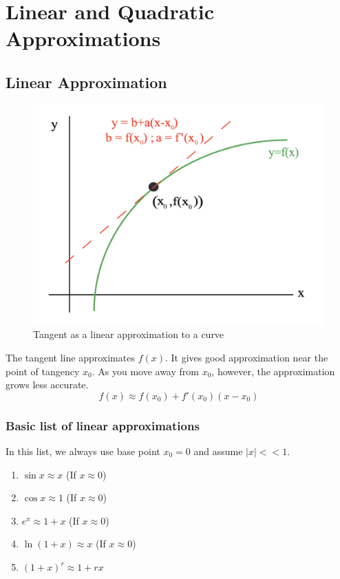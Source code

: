 

\chapter{Linear and Quadratic Approximations}

\bigbreak
\section{Linear Approximation}

\begin{figure}[ht!]
	\centering
	\includegraphics[scale=0.5]{./images/lecture_7_figure_1.png}
	\caption{Tangent as a linear approximation to a curve}
\end{figure}

The tangent line approximates $f(x)$. It gives good approximation near the point of tangency $x_0$.
As you move away from $x_0$, however, the approximation grows less accurate.
$$\boxed{ f(x) \approx f(x_0) + f'(x_0)(x-x_0) } $$

\subsection{Basic list of linear approximations}

In this list, we always use base point $x_0 = 0$ and assume $|x|<<1$.
\begin{enumerate}
	\item $\sin x	\approx x$ (If $x \approx 0$)
	\item $\cos x	\approx 1$ (If $x \approx 0$)
	\item $e ^ x	\approx 1 + x$ (If $x \approx 0$)
	\item $\ln(1+x)	\approx x$ (If $x \approx 0$)
	\item $(1+x)^r	\approx 1+rx$
\end{enumerate}

